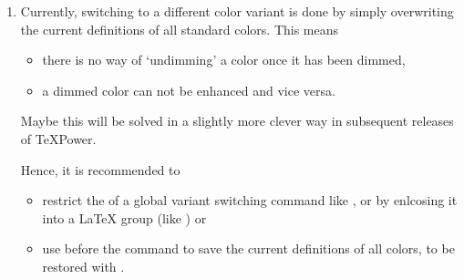\begin{slide}
\begin{enumerate}
    \newslide

    The following effects of the current algorithm should be kept in mind:
    \begin{itemize}
    \item if the background color is light, enhancing a color will make it darker;
    \item if the background color is dark, enhancing a color will make it lighter;
    \item sometimes, the numerical values describing an enhanced color have to be  to avoid exceeding
      the allowed range, diminishing the enhancing effect. For instance, if the background color is black and the color
      to be enhanced is a `full-powered' yellow, there is no way of enhancing it by simple numeric calculation.
    \end{itemize}

    \newslide

    As a conclusion, for best results it is recommended to provide custom  variants of colors to be enhanced. By
    default, \TeX Power does not provide dedicated enhanced colors, but the file  contains complete
    sets of enhanced variants for the standard colors in the different color sets, which you can uncomment and
    experiment with as convenient.

    \newslide

  \item Currently, switching to a different color variant is done by simply overwriting the current definitions of all
    standard colors. This means
    \begin{itemize}
    \item there is no way of `undimming' a color once it has been dimmed,
    \item a dimmed color can not be enhanced and vice versa.
    \end{itemize}
    Maybe this will be solved in a slightly more clever way in subsequent releases of \TeX Power.

    \newslide

    Hence, it is recommended to
    \begin{itemize}
    \item restrict the  of a global variant switching command like ,
       or  by enlcosing it into a \LaTeX{} group (like \code{\{\dots\}}) or
    \item use  before the command to save the current definitions of all colors, to be restored
      with .


\end{itemize}
\end{enumerate}
\end{slide}
